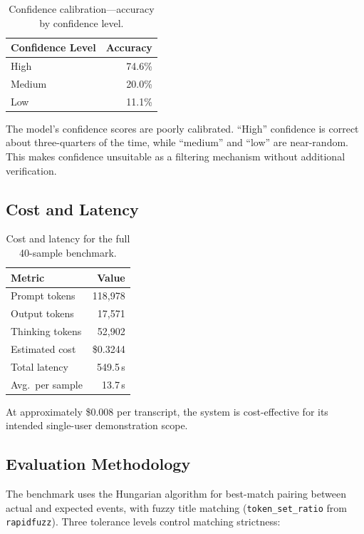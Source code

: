 \documentclass[12pt]{article}
\begin{document}
\begin{table}[ht]
\centering
\caption{Confidence calibration---accuracy by confidence level.}
\label{tab:confidence}
\begin{tabular}{@{}lr@{}}
\toprule
\textbf{Confidence Level} & \textbf{Accuracy} \\
\midrule
High   & 74.6\% \\
Medium & 20.0\% \\
Low    & 11.1\% \\
\bottomrule
\end{tabular}
\end{table}

The model's confidence scores are poorly calibrated. ``High'' confidence
is correct about three-quarters of the time, while ``medium'' and ``low''
are near-random. This makes confidence unsuitable as a filtering
mechanism without additional verification.

\subsection{Cost and Latency}

\begin{table}[ht]
\centering
\caption{Cost and latency for the full 40-sample benchmark.}
\label{tab:cost}
\begin{tabular}{@{}lr@{}}
\toprule
\textbf{Metric} & \textbf{Value} \\
\midrule
Prompt tokens   & 118{,}978 \\
Output tokens   & 17{,}571 \\
Thinking tokens & 52{,}902 \\
Estimated cost  & \$0.3244 \\
Total latency   & 549.5\,s \\
Avg.\ per sample & 13.7\,s \\
\bottomrule
\end{tabular}
\end{table}

At approximately \$0.008 per transcript, the system is cost-effective for
its intended single-user demonstration scope.

\subsection{Evaluation Methodology}

The benchmark uses the Hungarian algorithm for best-match pairing between
actual and expected events, with fuzzy title matching
(\texttt{token\_set\_ratio} from \texttt{rapidfuzz}). Three tolerance
levels control matching strictness:
\end{document}

